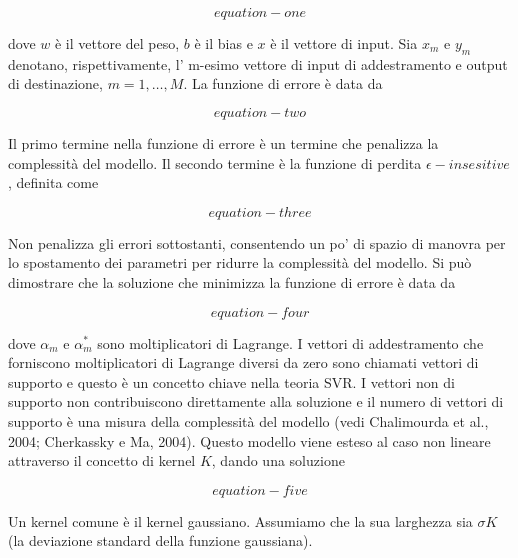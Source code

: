 \documentclass[12pt,a4paper]{report}
\begin{document}
\begin{equation}
equation-one
\end{equation}

dove $w$ è il vettore del peso, $b$ è il bias e $x$ è il vettore di input. Sia $x_m$ e $y_m$ denotano, rispettivamente, l' m-esimo vettore di input di addestramento e output di destinazione, $m = 1, …, M$. La funzione di errore è data da 

\begin{equation}
equation-two
\end{equation}

Il primo termine nella funzione di errore è un termine che penalizza la complessità del modello. Il secondo termine è la funzione di perdita $\epsilon-insesitive$, definita come

\begin{equation}
equation-three
\end{equation}

Non penalizza gli errori sottostanti, consentendo un po' di spazio di manovra per lo spostamento dei parametri per ridurre la complessità del modello. Si può dimostrare che la soluzione che minimizza la funzione di errore è data da

\begin{equation}
equation-four
\end{equation}

dove $\alpha_m$ e $\alpha_m^\ast$ sono moltiplicatori di Lagrange. I vettori di addestramento che forniscono moltiplicatori di Lagrange diversi da zero sono chiamati vettori di supporto e questo è un concetto chiave nella teoria SVR. I vettori non di supporto non contribuiscono direttamente alla soluzione e il numero di vettori di supporto è una misura della complessità del modello (vedi Chalimourda et al., 2004; Cherkassky e Ma, 2004). Questo modello viene esteso al caso non lineare attraverso il concetto di kernel $K$, dando una soluzione

\begin{equation}
equation-five
\end{equation}

Un kernel comune è il kernel gaussiano. Assumiamo che la sua larghezza sia $\sigma K$ (la deviazione standard della funzione gaussiana).
\end{document}
